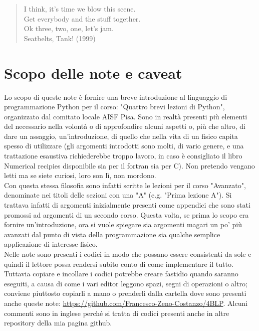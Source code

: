 \documentclass[10pt,a4paper]{article}
\begin{document}
\vfill
\begin{quote}
    I think, it's time we blow this scene.\\
    Get everybody and the stuff together.\\
    Ok three, two, one, let's jam.\\
    Seatbelts, Tank! (1999)
\end{quote}


\newpage
\tableofcontents
\newpage
\hypersetup{hidelinks}


\section{Scopo delle note e caveat}
Lo scopo di queste note è fornire una breve introduzione al linguaggio di programmazione Python per il corso: "Quattro brevi lezioni di Python", organizzato dal comitato locale AISF Pisa.
Sono in realtà presenti più elementi del necessario nella volontà o di approfondire alcuni aspetti o, più che altro, di dare un assaggio, un'introduzione, di quello che nella vita di un fisico capita spesso di utilizzare (gli argomenti introdotti sono molti, di vario genere, e una trattazione esaustiva richiederebbe troppo lavoro, in caso è consigliato il libro Numerical recipies disponibile sia per il fortran sia per C). Non pretendo vengano letti ma se siete curiosi, loro son lì, non mordono.
\\

\noindent Con questa stessa filosofia sono infatti scritte le lezioni per il corso "Avanzato", denominate nei titoli delle sezioni con una "A" (e.g. "Prima lezione A"). Si trattava infatti di argomenti inizialmente presenti come appendici che sono stati promossi ad argomenti di un secondo corso. Questa volta, se prima lo scopo era fornire un'introduzione, ora si vuole spiegare sia argomenti magari un po' più avanzati dal punto di vista della programmazione sia qualche semplice applicazione di interesse fisico.\\

\noindent Nelle note sono presenti i codici in modo che possano essere consistenti da sole e quindi il lettore possa rendersi subito conto di come implementare il tutto. Tuttavia copiare e incollare i codici potrebbe creare fastidio quando saranno eseguiti, a causa di come i vari editor leggono spazi, segni di operazioni o altro; conviene piuttosto copiarli a mano o prenderli dalla cartella dove sono presenti anche queste note: \url{https://github.com/Francesco-Zeno-Costanzo/4BLP}. Alcuni commenti sono in inglese perché si tratta di codici presenti anche in altre repository della mia pagina github.
\end{document}
